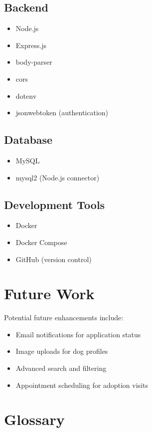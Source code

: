 \documentclass[12pt]{article}
\begin{document}
\subsection{Backend}
\begin{itemize}
\item Node.js
\item Express.js
\item body-parser
\item cors
\item dotenv
\item jsonwebtoken (authentication)
\end{itemize}

\subsection{Database}
\begin{itemize}
\item MySQL
\item mysql2 (Node.js connector)
\end{itemize}

\subsection{Development Tools}
\begin{itemize}
\item Docker
\item Docker Compose
\item GitHub (version control)
\end{itemize}

\section{Future Work}

Potential future enhancements include:

\begin{itemize}
\item Email notifications for application status
\item Image uploads for dog profiles
\item Advanced search and filtering
\item Appointment scheduling for adoption visits
\end{itemize}

\section{Glossary}
\end{document}
